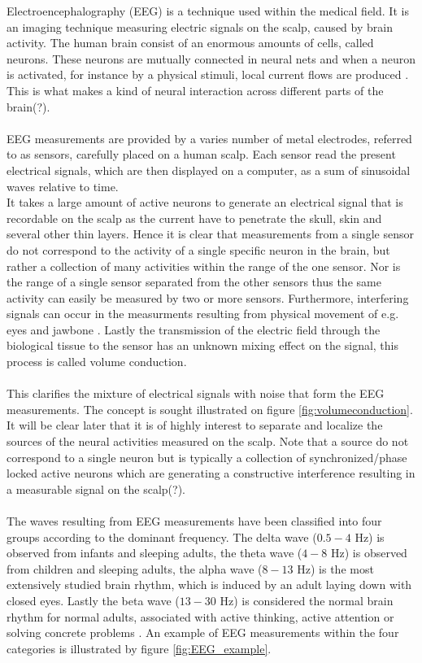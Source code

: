 Electroencephalography (EEG) is a technique used within the medical field. It is an imaging technique measuring electric signals on the scalp, caused by brain activity. 
The human brain consist of an enormous amounts of cells, called neurons. These neurons are mutually connected in neural nets and when a neuron is activated, for instance by a physical stimuli, local current flows are produced \cite{fundamentalEEG}. This is what makes a kind of neural interaction across different parts of the brain(?). 
\\
\\
EEG measurements are provided by a varies number of metal electrodes, referred to as sensors, carefully placed on a human scalp. Each sensor read the present electrical signals, which are then displayed on a computer, as a sum of sinusoidal waves relative to time.
\\
It takes a large amount of active neurons to generate an electrical signal that is recordable on the scalp as the current have to penetrate the skull, skin and several other thin layers.
Hence it is clear that measurements from a single sensor do not correspond to the activity of a single specific neuron in the brain, but rather a collection of many activities within the range of the one sensor.
Nor is the range of a single sensor separated from the other sensors thus the same activity can easily be measured by two or more sensors.
Furthermore, interfering signals can occur in the measurments resulting from physical movement of e.g. eyes and jawbone \cite{fundamentalEEG}. 
Lastly the transmission of the electric field through the biological tissue to the sensor has an unknown mixing effect on the signal, this process is called volume conduction\cite[p. 68]{EEGsignalprocessing}\cite{Van2019}.\\ \\
This clarifies the mixture of electrical signals with noise that form the EEG measurements. The concept is sought illustrated on figure \ref{fig:volumeconduction}. \\
It will be clear later that it is of highly interest to separate and localize the sources of the neural activities measured on the scalp. Note that a source do not correspond to a single neuron but is typically a collection of synchronized/phase locked active neurons which are generating a constructive interference resulting in a measurable signal on the scalp(?).     
\\
\\
The waves resulting from EEG measurements have been classified into four groups according to the dominant frequency. The delta wave ($0.5-4$ Hz) is observed from infants and sleeping adults, the theta wave ($4-8$ Hz) is observed from children and sleeping adults, the alpha wave ($8-13$ Hz) is the most extensively studied brain rhythm, which is induced by an adult laying down with closed eyes. Lastly the beta wave ($13-30$ Hz) is considered the normal brain rhythm for normal adults, associated with active thinking, active attention or solving concrete problems \cite[p. 11]{EEGsignalprocessing}. An example of EEG measurements within the four categories is illustrated by figure \ref{fig:EEG_example}.        
